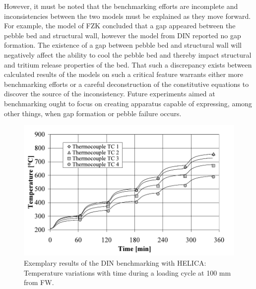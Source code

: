 However, it must be noted that the benchmarking efforts are incomplete and inconsistencies between the two models must be explained as they move forward. For example, the model of FZK concluded that a gap appeared between the pebble bed and structural wall, however the model from DIN reported no gap formation. The existence of a gap between pebble bed and structural wall will negatively affect the ability to cool the pebble bed and thereby impact structural and tritium release properties of the bed. That such a discrepancy exists between calculated results of the models on such a critical feature warrants either more benchmarking efforts or a careful deconstruction of the constitutive equations to discover the source of the inconsistency. Future experiments aimed at benchmarking ought to focus on creating apparatus capable of expressing, among other things, when gap formation or pebble failure occurs.


\begin{figure}[t!]
    \centering
    \includegraphics[width=\singleimagewidth]{figures/Fig-8}
    \caption{Exemplary results of the DIN benchmarking with HELICA: Temperature variations with time during a loading cycle at 100 mm from FW\cite{DellOrco:2007hc}.}
    \label{fig:DIN_HELICA}
\end{figure}


